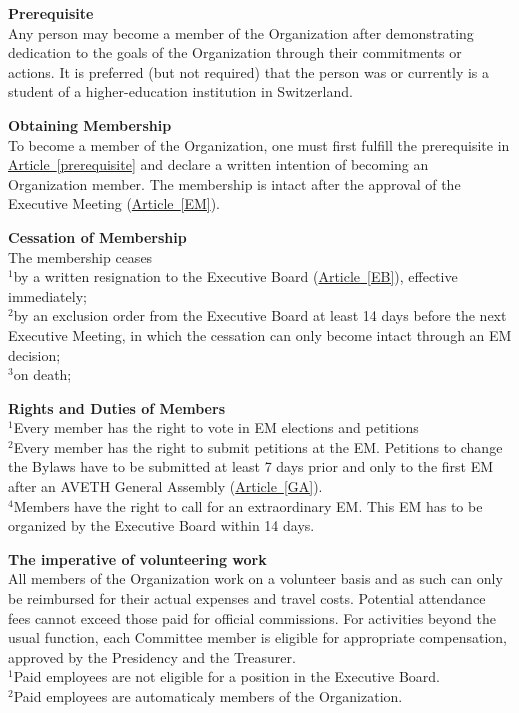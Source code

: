 \documentclass[10pt]{article}
\newcounter{qcounter}
\begin{document}
\begin{list}{{\bf Article :~}}{}
\item {\bf Prerequisite}\label{prerequisite}\\
Any person may become a member of the Organization after demonstrating dedication to the goals of the Organization through their commitments or actions. It is preferred (but not required) that the person was or currently is a student of a higher-education institution in Switzerland.

\item {\bf Obtaining Membership}\\
To become a member of the Organization, one must first fulfill the prerequisite in \hyperref[prerequisite]{Article~\ref{prerequisite}} and declare a written intention of becoming an Organization member. The membership is intact after the approval of the Executive Meeting (\hyperref[EM]{Article~\ref{EM}}).

\item {\bf Cessation of Membership}\\ \label{cessation}
The membership ceases\\ 
$^{1}$by a written resignation to the Executive Board (\hyperref[EB]{Article~\ref{EB}}), effective immediately;\\
$^{2}$by an exclusion order from the Executive Board at least 14 days before the next Executive Meeting, in which the cessation can only become intact through an EM decision;\\
$^{3}$on death;

\item {\bf Rights and Duties of Members}\label{Duties}\\
$^{1}$Every member has the right to vote in EM elections and petitions\\
$^{2}$Every member has the right to submit petitions at the EM. Petitions to change the Bylaws have to be submitted at least 7 days prior and only to the first EM after an AVETH General Assembly (\hyperref[GA]{Article~\ref{GA}}).\\
$^{4}$Members have the right to call for an extraordinary EM. This EM has to be organized by the Executive Board within 14 days.\\

\item {\bf The imperative of volunteering work}\\
All members of the Organization work on a volunteer basis and as such can only be reimbursed for their actual expenses and travel costs. Potential attendance fees cannot exceed those paid for official commissions. For activities beyond the usual function, each Committee member is eligible for appropriate compensation, approved by the Presidency and the Treasurer. \\
$^{1}$Paid employees are not eligible for a position in the Executive Board.\\
$^{2}$Paid employees are automaticaly members of the Organization.


\end{list}
\end{document}
